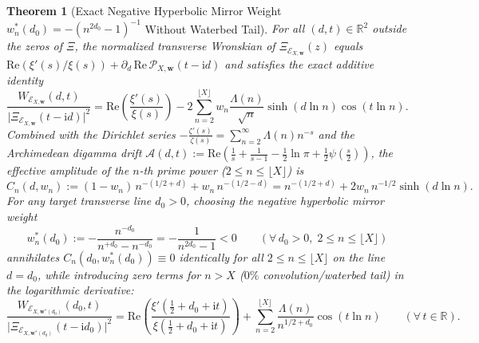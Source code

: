 \documentclass[11pt,reqno]{amsart}
\newtheorem{theorem}{Theorem}[section]
\theoremstyle{definition}
\theoremstyle{remark}
\numberwithin{equation}{section}
\newcommand{\R}{\mathbb{R}}
\newcommand{\ii}{\mathrm{i}}
\newcommand{\Rea}{\mathrm{Re}}
\begin{document}
\begin{theorem}[Exact Negative Hyperbolic Mirror Weight $w_n^*(d_0) = -(n^{2d_0}-1)^{-1}$ Without Waterbed Tail]\label{thm:hyperbolic_mirror_weight}
For all $(d,t) \in \R^2$ outside the zeros of $\Xi$, the normalized transverse Wronskian of $\Xi_{\mathcal{E}_{X,\mathbf{w}}}(z)$ equals $\Rea(\xi'(s)/\xi(s)) + \partial_d\,\Rea\,\mathcal{P}_{X,\mathbf{w}}(t - \ii d)$ and satisfies the exact additive identity
\begin{equation}\label{eq:normalized_wronskian_weighted}
\frac{W_{\mathcal{E}_{X,\mathbf{w}}}(d,t)}{\bigl|\Xi_{\mathcal{E}_{X,\mathbf{w}}}(t - \ii d)\bigr|^2} = \Rea\!\left(\frac{\xi'(s)}{\xi(s)}\right) - 2\sum_{n=2}^{\lfloor X\rfloor} w_n\frac{\Lambda(n)}{\sqrt{n}}\sinh(d\ln n)\cos(t\ln n).
\end{equation}
Combined with the Dirichlet series $-\frac{\zeta'(s)}{\zeta(s)} = \sum_{n=2}^{\infty} \Lambda(n)n^{-s}$ and the Archimedean digamma drift $\mathcal{A}(d,t) := \Rea(\frac{1}{s} + \frac{1}{s-1} - \frac{1}{2}\ln\pi + \frac{1}{2}\psi(\frac{s}{2}))$, the effective amplitude of the $n$-th prime power ($2 \le n \le \lfloor X\rfloor$) is
\begin{equation}\label{eq:Cn_effective}
C_n(d, w_n) := (1 - w_n)\,n^{-(1/2+d)} + w_n\,n^{-(1/2-d)} = n^{-(1/2+d)} + 2w_n\,n^{-1/2}\sinh(d\ln n).
\end{equation}
For any target transverse line $d_0 > 0$, choosing the \emph{negative hyperbolic mirror weight}
\begin{equation}\label{eq:w_star_boxed}
\boxed{w_n^*(d_0) := -\frac{n^{-d_0}}{n^{+d_0} - n^{-d_0}} = -\frac{1}{n^{2d_0} - 1} < 0 \qquad (\forall\, d_0 > 0,\; 2 \le n \le \lfloor X\rfloor)}
\end{equation}
annihilates $C_n(d_0, w_n^*(d_0)) \equiv 0$ identically for all $2 \le n \le \lfloor X\rfloor$ on the line $d = d_0$, while introducing \emph{zero terms for $n > X$ ($0\%$ convolution/waterbed tail)} in the logarithmic derivative:
\begin{equation}\label{eq:tail_free_cancellation}
\frac{W_{\mathcal{E}_{X,\mathbf{w}^*(d_0)}}(d_0,t)}{\bigl|\Xi_{\mathcal{E}_{X,\mathbf{w}^*(d_0)}}(t - \ii d_0)\bigr|^2} = \Rea\!\left(\frac{\xi'(\frac{1}{2}+d_0+\ii t)}{\xi(\frac{1}{2}+d_0+\ii t)}\right) + \sum_{n=2}^{\lfloor X\rfloor} \frac{\Lambda(n)}{n^{1/2+d_0}}\cos(t\ln n) \qquad (\forall\, t \in \R).
\end{equation}
\end{theorem}
\end{document}
